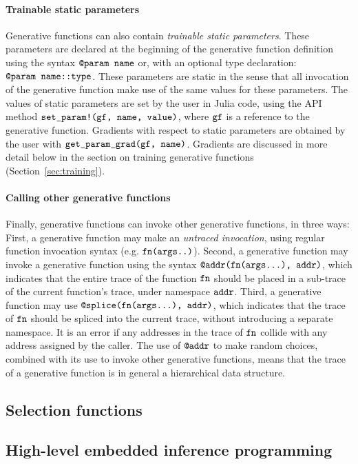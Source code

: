 \paragraph{Trainable static parameters}
Generative functions can also contain \emph{trainable static parameters}.
These parameters are declared at the beginning of the generative function definition using the syntax $\mbox{\texttt{@param name}}$ or, with an optional type declaration: $\mbox{\texttt{@param name::type}}$.
These parameters are static in the sense that all invocation of the generative function make use of the same values for these parameters.
The values of static parameters are set by the user in Julia code, using the API method $\mbox{\texttt{set\_param!(gf, name, value)}}$, where $\mbox{\texttt{gf}}$ is a reference to the generative function.
Gradients with respect to static parameters are obtained by the user with $\mbox{\texttt{get\_param\_grad(gf, name)}}$.
Gradients are discussed in more detail below in the section on training generative functions (Section~\ref{sec:training}).

\paragraph{Calling other generative functions}
Finally, generative functions can invoke other generative functions, in three ways:
First, a generative function may make an \emph{untraced invocation}, using regular function invocation syntax (e.g. $\mbox{\texttt{fn(args..)}}$).
Second, a generative function may invoke a generative function using the syntax $\mbox{\texttt{@addr(fn(args...), addr)}}$, which indicates that the entire trace of the function $\mbox{\texttt{fn}}$ should be placed in a sub-trace of the current function's trace, under namespace $\mbox{\texttt{addr}}$.
Third, a generative function may use $\mbox{\texttt{@splice(fn(args...), addr)}}$, which indicates that the trace of $\mbox{\texttt{fn}}$ should be spliced into the current trace, without introducing a separate namespace.
It is an error if any addresses in the trace of $\mbox{\texttt{fn}}$ collide with any address assigned by the caller.
The use of $\mbox{\texttt{@addr}}$ to make random choices, combined with its use to invoke other generative functions, means that the trace of a generative function is in general a hierarchical data structure.

\subsection{Selection functions}

\subsection{High-level embedded inference programming}

